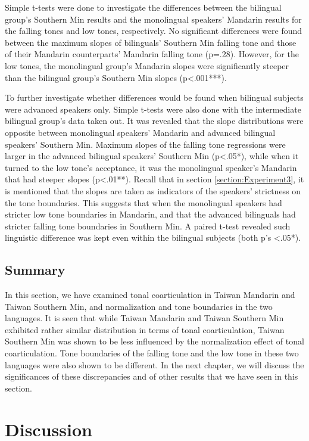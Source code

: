 \documentclass[12pt]{report}
\begin{document}
\begin{CJK}{UTF8}{bsmi}
Simple t-tests were done to investigate the differences between the bilingual group's Southern Min results and the monolingual speakers' Mandarin results for the falling tones and low tones, respectively. No significant differences were found between the maximum slopes of bilinguals' Southern Min falling tone and those of their Mandarin counterparts' Mandarin falling tone (p=.28). However, for the low tones, the monolingual group's Mandarin slopes were significantly steeper than the bilingual group's Southern Min slopes (p<.001***).

To further investigate whether differences would be found when bilingual subjects were advanced speakers only. Simple t-tests were also done with the intermediate bilingual group's data taken out. It was revealed that the slope distributions were opposite between monolingual speakers' Mandarin and advanced bilingual speakers' Southern Min. Maximum slopes of the falling tone regressions were larger in the advanced bilingual speakers' Southern Min (p<.05*), while when it turned to the low tone's acceptance, it was the monolingual speaker's Mandarin that had steeper slopes (p<.01**). Recall that in section \ref{section:Experiment3}, it is mentioned that the slopes are taken as indicators of the speakers' strictness on the tone boundaries. This suggests that when the monolingual speakers had stricter low tone boundaries in Mandarin, and that the advanced bilinguals had stricter falling tone boundaries in Southern Min. A paired t-test revealed such linguistic difference was kept even within the bilingual subjects (both p's <.05*).

\section{Summary}
In this section, we have examined tonal coarticulation in Taiwan Mandarin and Taiwan Southern Min, and normalization and tone boundaries in the two languages. It is seen that while Taiwan Mandarin and Taiwan Southern Min exhibited rather similar distribution in terms of tonal coarticulation, Taiwan Southern Min was shown to be less influenced by the normalization effect of tonal coarticulation. Tone boundaries of the falling tone and the low tone in these two languages were also shown to be different. In the next chapter, we will discuss the significances of these discrepancies and of other results that we have seen in this section.

\pagebreak
\chapter{Discussion}


\end{CJK}
\end{document}
